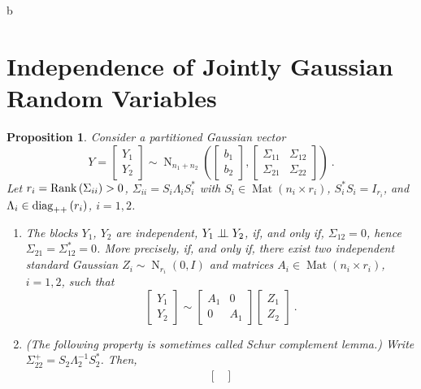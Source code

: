 \documentclass[12pt,a4paper]{amsart}
\newcommand{\MRof}[2]{\operatorname{Mat}\left(#1\times#2\right)}
\newcommand{\gaussian}[3]{\operatorname{N}_{#1}\left(#2,#3\right)}
\newcommand{\ppdiag}[1]{\diag_{++}\left(#1\right)}
\theoremstyle{plain}%
\newtheorem{proposition}[thm]{Proposition}
\theoremstyle{definition}
\theoremstyle{remark}
\begin{document}
b\section{Independence of Jointly Gaussian Random Variables}
\label{sec:conditioniong}

\begin{proposition} 
Consider a partitioned Gaussian vector
%
  \begin{equation*}
    Y =
    \begin{bmatrix}
      Y_1 \\ Y_2
    \end{bmatrix}
\sim \gaussian {n_1+n_2}
{\begin{bmatrix}
  b_1 \\ b_2  
\end{bmatrix}}
{\begin{bmatrix}
      \Sigma_{11} & \Sigma_{12} \\ \Sigma_{21} & \Sigma_{22}
    \end{bmatrix}} \ .
  \end{equation*}
Let $r_i = \operatorname{Rank}\left(\Sigma_{ii}\right) > 0$, $\Sigma_{ii} = S_i \Lambda_i S_i^*$ with $S_i \in \MRof {n_i} {r_i}$, $S_i^*S_i = I_{r_i}$, and $\Lambda_i \in \ppdiag {r_i}$, $i = 1,2$.
%
  \begin{enumerate}
  \item The blocks $Y_1$, $Y_2$ are independent, $Y_1 \perp\!\!\!\perp Y_2$, if, and only if, $\Sigma_{12} = 0$, hence $\Sigma_{21} = \Sigma_{12}^* = 0$. More precisely, if, and only if, there exist two independent standard Gaussian $Z_i \sim \gaussian {r_i} {0} {I}$ and matrices $A_i \in \MRof {n_i} {r_i}$, $i=1,2$, such that
%
\begin{equation*}
 \begin{bmatrix} Y_1 \\ Y_2
 \end{bmatrix}
 \sim
 \begin{bmatrix}
   A_1 & 0 \\ 0 & A_1
 \end{bmatrix}
 \begin{bmatrix}
   Z_1 \\ Z_2
 \end{bmatrix}
\ .
\end{equation*}
%
\item (The following property is sometimes called \emph{Schur complement lemma}.) Write $\Sigma_{22}^+ = S_2 \Lambda_2^{-1} S_2^*$.  Then,
%
\begin{multline*}
  \begin{bmatrix}

\end{bmatrix}
\end{multline*}
\end{enumerate}
\end{proposition}
\end{document}
